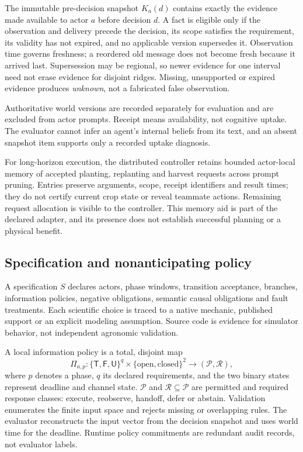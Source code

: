\documentclass[sigconf,anonymous]{aamas}
\begin{document}
The immutable pre-decision snapshot $K_a(d)$ contains exactly the evidence made available to actor $a$ before decision $d$. A fact is eligible only if the observation and delivery precede the decision, its scope satisfies the requirement, its validity has not expired, and no applicable version supersedes it. Observation time governs freshness; a reordered old message does not become fresh because it arrived last. Supersession may be regional, so newer evidence for one interval need not erase evidence for disjoint ridges. Missing, unsupported or expired evidence produces \emph{unknown}, not a fabricated false observation.

Authoritative world versions are recorded separately for evaluation and are excluded from actor prompts. Receipt means availability, not cognitive uptake. The evaluator cannot infer an agent's internal beliefs from its text, and an absent snapshot item supports only a recorded uptake diagnosis.

For long-horizon execution, the distributed controller retains bounded actor-local memory of accepted planting, replanting and harvest requests across prompt pruning. Entries preserve arguments, scope, receipt identifiers and result times; they do not certify current crop state or reveal teammate actions. Remaining request allocation is visible to the controller. This memory aid is part of the declared adapter, and its presence does not establish successful planning or a physical benefit.

\subsection{Specification and nonanticipating policy}
A specification $S$ declares actors, phase windows, transition acceptance, branches, information policies, negative obligations, semantic causal obligations and fault treatments. Each scientific choice is traced to a native mechanic, published support or an explicit modeling assumption. Source code is evidence for simulator behavior, not independent agronomic validation.

A local information policy is a total, disjoint map
\[
 \Pi_{a,p}:\{\mathsf{T},\mathsf{F},\mathsf{U}\}^{q}
 \times\{\mathrm{open},\mathrm{closed}\}^{2}
 \longrightarrow(\mathcal P,\mathcal R),
\]
where $p$ denotes a phase, $q$ its declared requirements, and the two binary states represent deadline and channel state. $\mathcal P$ and $\mathcal R\subseteq\mathcal P$ are permitted and required response classes: execute, reobserve, handoff, defer or abstain. Validation enumerates the finite input space and rejects missing or overlapping rules. The evaluator reconstructs the input vector from the decision snapshot and uses world time for the deadline. Runtime policy commitments are redundant audit records, not evaluator labels.
\end{document}
